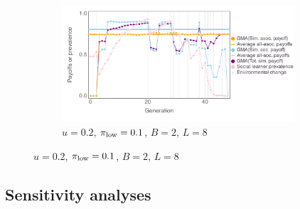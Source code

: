 \documentclass[letterpaper,11.5pt]{scrartcl}
\begin{document}
\begin{figure}
\hspace{-2em}
    \begin{subfigure}[]{0.75\textwidth}
      \centering
      \caption{$u=0.2$, $\pi_{\mathrm{low}}=0.1$, $B=2$, $L=8$}
      \includegraphics[width=0.95\textwidth]{Figures/geopayoff_series/geopayseries_u=0.2-lowpayoff=0.1-nbehaviors=2-L=8.pdf}
    \end{subfigure}


\end{figure}


\subsection{Sensitivity analyses}
\end{document}
